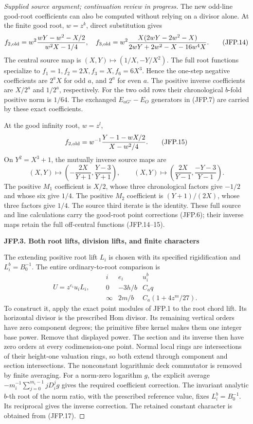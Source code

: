 \begin{proof}[Supplied source argument; continuation review in progress]
The new odd-line good-root coefficients can also be computed
without relying on a divisor alone. At the finite good root,
\(w=z^k\), direct substitution gives
\[
 f_{2,\rm old}=w^2\frac{wY-w^2-X/2}{w^2X-1/4},\quad
 f_{3,\rm old}=w^2\frac{X(2wY-2w^2-X)}
 {2wY+2w^2-X-16w^4X}.
\tag{JFP.14}
\]
The central source map is \((X,Y)\mapsto(1/X,-Y/X^2)\).
The full root functions specialize to \(f_1=1,f_2=2X,
f_3=X,f_6=6X^3\). Hence the one-step negative coefficients
are \(2^aX\) for odd \(a\), and \(2^a\) for even \(a\).
The positive inverse coefficients are \(X/2^a\) and \(1/2^a\),
respectively. For the two odd rows their chronological \(b\)-fold
positive norm is \(1/64\). The exchanged \(E_{aG'}-E_O\)
generators in (JFP.7) are carried by these exact coefficients.

At the good infinity root, \(w=z^l\),
\[
 f_{2,\rm old}=w^{-1}\frac{Y-1-wX/2}{X-w^2/4}.
\tag{JFP.15}
\]
On \(Y^2=X^3+1\), the mutually inverse source maps are
\[
 (X,Y)\mapsto\left(-\frac{2X}{Y+1},\frac{Y-3}{Y+1}\right),
 \qquad
 (X,Y)\mapsto\left(\frac{2X}{Y-1},\frac{-Y-3}{Y-1}\right).
\tag{JFP.16}
\]
The positive \(M_1\) coefficient is \(X/2\), whose three
chronological factors give \(-1/2\) and whose six give \(1/4\).
The positive \(M_2\) coefficient is \((Y+1)/(2X)\), whose
three factors give \(1/4\). The source third iterate is the
identity. These full source and line calculations carry the
good-root point corrections (JFP.6); their inverse maps retain
the full off-central functions (JFP.14--15).

\par

\medskip\noindent\textbf{JFP.3. Both root lifts, division lifts, and finite characters}

\par\nobreak

The extending positive root lift \(L_i\) is chosen with its
specified rigidification and \(L_i^b=B_0^{-1}\). The entire
ordinary-to-root comparison is
\[
 U=z^{e_i}u_i L_i,\qquad
 \begin{array}{c|c|c}
 i&e_i&u_i^b\\\hline
 0&-3h/b&C_aq\\
 \infty&2m/b&C_a(1+4z^m/27).
 \end{array}
\tag{JFP.17}
\]
To construct it, apply the exact point modules of JFP.1 to the
root chord lift. Its horizontal divisor is the prescribed Hom
divisor. Its remaining vertical orders have zero component degrees;
the primitive fibre kernel makes them one integer base power.
Remove that displayed power. The section and its inverse then
have zero orders at every codimension-one point. Normal local
rings are intersections of their height-one valuation rings, so
both extend through component and section intersections. The
nonconstant logarithmic deck commutator is removed by finite
averaging. For a norm-zero logarithm \(g\), the explicit average
\(-m_i^{-1}\sum_{j=0}^{m_i-1}jD_i^jg\) gives the required
coefficient correction. The invariant analytic \(b\)-th root
of the norm ratio, with the prescribed reference value, fixes
\(L_i^b=B_0^{-1}\). Its reciprocal gives the inverse correction.
The retained constant character is obtained from (JFP.17).


\end{proof}
